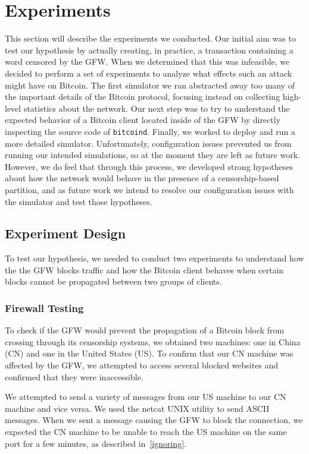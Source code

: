 \section{Experiments}
This section will describe the experiments we conducted. Our initial aim was to test our hypothesis by actually creating, in practice, a transaction containing a word censored by the GFW. When we determined that this was infeasible, we decided to perform a set of experiments to analyze what effects such an attack might have on Bitcoin. The first simulator we ran abstracted away too many of the important details of the Bitcoin protocol, focusing instead on collecting high-level statistics about the network. Our next step was to try to understand the expected behavior of a Bitcoin client located inside of the GFW by directly inspecting the source code of \texttt{bitcoind}. Finally, we worked to deploy and run a more detailed simulator. Unfortunately, configuration issues prevented us from running our intended simulations, so at the moment they are left as future work. However, we do feel that through this process, we developed strong hypotheses about how the network would behave in the presence of a censorship-based partition, and as future work we intend to resolve our configuration issues with the simulator and test those hypotheses.

\subsection{Experiment Design}
To test our hypothesis, we needed to conduct two experiments to understand how the the GFW blocks traffic and how the Bitcoin client behaves when certain blocks cannot be propagated between two groups of clients.

\subsubsection{Firewall Testing}
To check if the GFW would prevent the propagation of a Bitcoin block from crossing through its censorship systems, we obtained two machines: one in China (CN) and one in the United States (US). To confirm that our CN machine was affected by the GFW, we attempted to access several blocked websites and confirmed that they were inaccessible.

We attempted to send a variety of messages from our US machine to our CN machine and vice versa. We used the netcat UNIX utility to send ASCII messages. When we sent a message causing the GFW to block the connection, we expected the CN machine to be unable to reach the US machine on the same port for a few minutes, as described in~\ref{ignoring}.

